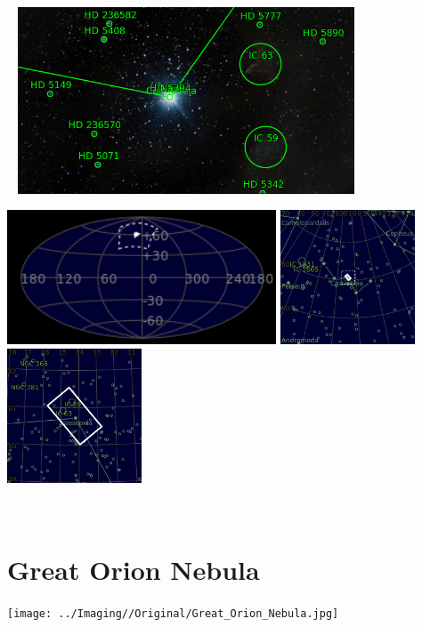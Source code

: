 \begin{center}
 \ \newpage
\includegraphics[width=0.75\textwidth]{../Imaging//Annotated/Ghost_Of_Cassiopeia_Annotated.jpg}

\includegraphics[height=4cm]{../Imaging//Annotated/Ghost_Of_Cassiopeia_Globe.jpg}
\includegraphics[height=4cm]{../Imaging//Annotated/Ghost_Of_Cassiopeia_Close.jpg}
\includegraphics[height=4cm]{../Imaging//Annotated/Ghost_Of_Cassiopeia_Closer.jpg}
\end{center}
\ \\\section{Great Orion Nebula}
\texttt{[image: ../Imaging//Original/Great\_Orion\_Nebula.jpg]}
